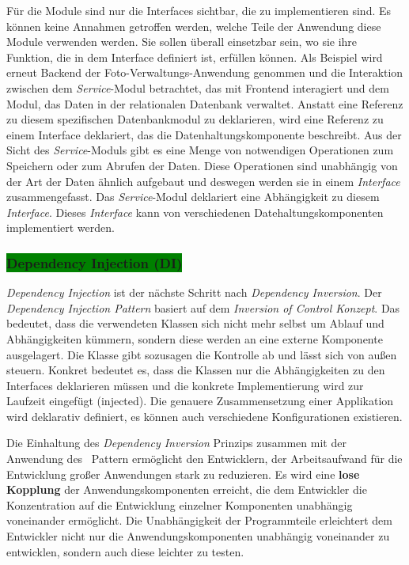 \begin{itemize}
Für die Module sind nur die Interfaces sichtbar, die zu implementieren sind. Es können keine Annahmen getroffen werden, welche Teile der Anwendung diese Module verwenden werden. Sie sollen überall einsetzbar sein, wo sie ihre Funktion, die in dem Interface definiert ist, erfüllen können. Als Beispiel wird erneut Backend der Foto-Verwaltungs-Anwendung genommen und die Interaktion zwischen dem \textit{Service}-Modul betrachtet, das mit Frontend interagiert und dem Modul, das Daten in der relationalen Datenbank verwaltet. Anstatt eine Referenz zu diesem spezifischen Datenbankmodul zu deklarieren, wird eine Referenz zu einem Interface deklariert, das die Datenhaltungskomponente beschreibt. Aus der Sicht des \textit{Service}-Moduls gibt es eine Menge von notwendigen Operationen zum Speichern oder zum Abrufen der Daten. Diese Operationen sind unabhängig von der Art der Daten ähnlich aufgebaut und deswegen werden sie in einem \textit{Interface} zusammengefasst. Das \textit{Service}-Modul deklariert eine Abhängigkeit zu diesem \textit{Interface}. Dieses \textit{Interface} kann von verschiedenen Datehaltungskomponenten implementiert werden.

\end{itemize}

\subsubsection{\colorbox{green}{Dependency Injection (DI)}}\label{di}

\textit{Dependency Injection} ist der nächste Schritt nach \textit{Dependency Inversion}. Der \textit{Dependency Injection Pattern} basiert auf dem \textit{Inversion of Control Konzept}. Das bedeutet, dass die verwendeten Klassen sich nicht mehr selbst um Ablauf und Abhängigkeiten kümmern, sondern diese werden an eine externe Komponente ausgelagert. Die Klasse gibt sozusagen die Kontrolle ab und lässt sich von außen steuern. Konkret bedeutet es, dass die Klassen nur die Abhängigkeiten zu den Interfaces deklarieren müssen und die konkrete Implementierung wird zur Laufzeit eingefügt (injected). Die genauere Zusammensetzung einer Applikation wird deklarativ definiert, es können auch verschiedene Konfigurationen existieren.

Die Einhaltung des \textit{Dependency Inversion} Prinzips zusammen mit der Anwendung des \di\ Pattern ermöglicht den Entwicklern, der Arbeitsaufwand für die Entwicklung großer Anwendungen stark zu reduzieren.
Es wird eine \textbf{lose Kopplung} der Anwendungskomponenten erreicht, die dem Entwickler die Konzentration auf die Entwicklung einzelner Komponenten unabhängig voneinander ermöglicht. Die Unabhängigkeit der Programmteile erleichtert dem Entwickler nicht nur die Anwendungskomponenten unabhängig voneinander zu entwicklen, sondern auch diese leichter zu testen. 

